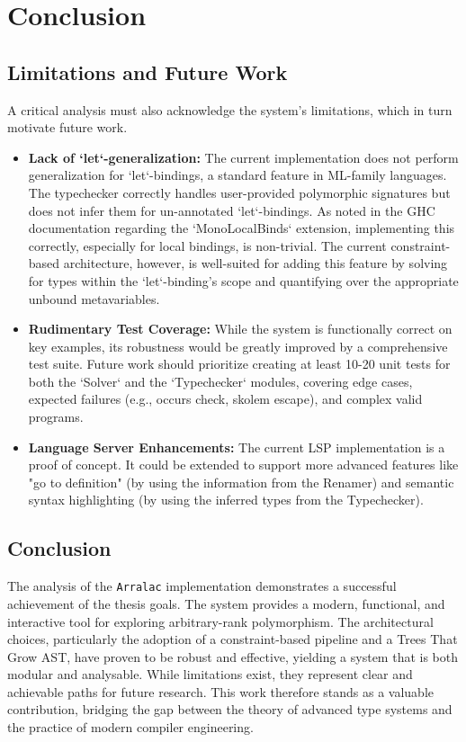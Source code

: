 \chapter{Conclusion}
\label{chap:Conclusion}

\section{Limitations and Future Work}
\label{sec:Discussion:Limitations}

A critical analysis must also acknowledge the system's limitations, which in turn motivate future work.

\begin{itemize}
    \item \textbf{Lack of `let`-generalization:} The current implementation does not perform generalization for `let`-bindings, a standard feature in ML-family languages. The typechecker correctly handles user-provided polymorphic signatures but does not infer them for un-annotated `let`-bindings. As noted in the GHC documentation regarding the `MonoLocalBinds` extension, implementing this correctly, especially for local bindings, is non-trivial. The current constraint-based architecture, however, is well-suited for adding this feature by solving for types within the `let`-binding's scope and quantifying over the appropriate unbound metavariables.

    \item \textbf{Rudimentary Test Coverage:} While the system is functionally correct on key examples, its robustness would be greatly improved by a comprehensive test suite. Future work should prioritize creating at least 10-20 unit tests for both the `Solver` and the `Typechecker` modules, covering edge cases, expected failures (e.g., occurs check, skolem escape), and complex valid programs.

    \item \textbf{Language Server Enhancements:} The current LSP implementation is a proof of concept. It could be extended to support more advanced features like "go to definition" (by using the information from the Renamer) and semantic syntax highlighting (by using the inferred types from the Typechecker).
\end{itemize}

\section{Conclusion}
The analysis of the \texttt{Arralac} implementation demonstrates a successful achievement of the thesis goals. The system provides a modern, functional, and interactive tool for exploring arbitrary-rank polymorphism. The architectural choices, particularly the adoption of a constraint-based pipeline and a Trees That Grow AST, have proven to be robust and effective, yielding a system that is both modular and analysable. While limitations exist, they represent clear and achievable paths for future research. This work therefore stands as a valuable contribution, bridging the gap between the theory of advanced type systems and the practice of modern compiler engineering.